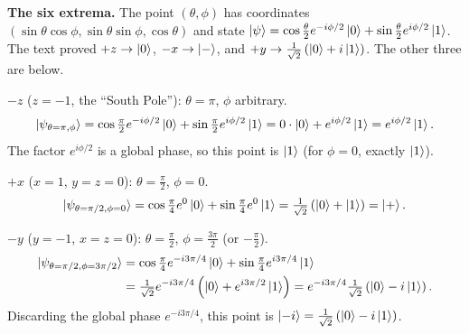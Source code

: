 \documentclass[a4paper, 10pt]{article}
\begin{document}
\begin{solution}
	\noindent \textbf{The six extrema.} The point \( (\theta, \phi) \) has coordinates \( (\sin\theta\cos\phi, \sin\theta\sin\phi, \cos\theta) \) and state \( \ket{\psi} = \cos\tfrac{\theta}{2}e^{-i\phi/2}\ket{0} + \sin\tfrac{\theta}{2}e^{i\phi/2}\ket{1} \). The text proved \( +z \to \ket{0} \), \( -x \to \ket{-} \), and \( +y \to \tfrac{1}{\sqrt{2}}\left(\ket{0} + i\ket{1}\right) \). The other three are below.

	\myspace

	\noindent \textbf{\( -z \)} (\( z = -1 \), the ``South Pole''): \( \theta = \pi \), \( \phi \) arbitrary.
	\[
		\ket{\psi_{\theta = \pi, \phi}} = \cos\tfrac{\pi}{2}e^{-i\phi/2}\ket{0} + \sin\tfrac{\pi}{2}e^{i\phi/2}\ket{1} = 0 \cdot \ket{0} + e^{i\phi/2}\ket{1} = e^{i\phi/2}\ket{1}.
	\]
	The factor \( e^{i\phi/2} \) is a global phase, so this point is \( \ket{1} \) (for \( \phi = 0 \), exactly \( \ket{1} \)).

	\noindent \textbf{\( +x \)} (\( x = 1 \), \( y = z = 0 \)): \( \theta = \tfrac{\pi}{2} \), \( \phi = 0 \).
	\[
		\ket{\psi_{\theta = \pi/2, \phi = 0}} = \cos\tfrac{\pi}{4}e^{0}\ket{0} + \sin\tfrac{\pi}{4}e^{0}\ket{1} = \tfrac{1}{\sqrt{2}}\left(\ket{0} + \ket{1}\right) = \ket{+}.
	\]

	\noindent \textbf{\( -y \)} (\( y = -1 \), \( x = z = 0 \)): \( \theta = \tfrac{\pi}{2} \), \( \phi = \tfrac{3\pi}{2} \) (or \( -\tfrac{\pi}{2} \)).
	\begin{align*}
		\ket{\psi_{\theta = \pi/2, \phi = 3\pi/2}} & = \cos\tfrac{\pi}{4}e^{-i3\pi/4}\ket{0} + \sin\tfrac{\pi}{4}e^{i3\pi/4}\ket{1}                                                           \\
		                                           & = \tfrac{1}{\sqrt{2}}e^{-i3\pi/4}\left(\ket{0} + e^{i3\pi/2}\ket{1}\right) = e^{-i3\pi/4}\tfrac{1}{\sqrt{2}}\left(\ket{0} - i\ket{1}\right).
	\end{align*}
	Discarding the global phase \( e^{-i3\pi/4} \), this point is \( \ket{{-i}} = \tfrac{1}{\sqrt{2}}\left(\ket{0} - i\ket{1}\right) \).

	\myspace


\end{solution}
\end{document}
